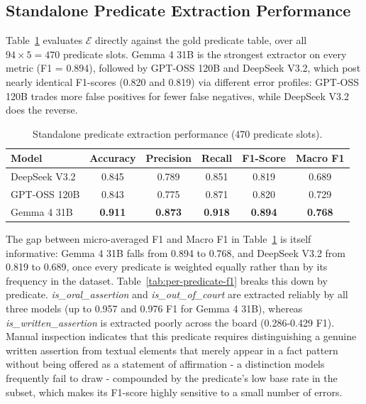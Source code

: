 \subsection{Standalone Predicate Extraction Performance}
\label{subsec:extraction}
Table~\ref{tab:predicate-extraction} evaluates $\mathcal{E}$ directly against the gold predicate table, over all $94 \times 5 = 470$ predicate slots. Gemma 4 31B is the strongest extractor on every metric (F1 = 0.894), followed by GPT-OSS 120B and DeepSeek V3.2, which post nearly identical F1-scores (0.820 and 0.819) via different error profiles: GPT-OSS 120B trades more false positives for fewer false negatives, while DeepSeek V3.2 does the reverse.

\begin{table}[htbp]
\centering
\caption{Standalone predicate extraction performance (470 predicate slots).}
\label{tab:predicate-extraction}
\begin{tabular}{lccccc}
\toprule
\textbf{Model} & \textbf{Accuracy} & \textbf{Precision} & \textbf{Recall} & \textbf{F1-Score} & \textbf{Macro F1} \\
\midrule
DeepSeek V3.2 & 0.845 & 0.789 & 0.851 & 0.819 & 0.689 \\
GPT-OSS 120B   & 0.843 & 0.775 & 0.871 & 0.820 & 0.729 \\
Gemma 4 31B   & \textbf{0.911} & \textbf{0.873} & \textbf{0.918} & \textbf{0.894} & \textbf{0.768} \\
\bottomrule
\end{tabular}
\end{table}

The gap between micro-averaged F1 and Macro F1 in Table~\ref{tab:predicate-extraction} is itself informative: Gemma 4 31B falls from 0.894 to 0.768, and DeepSeek V3.2 from 0.819 to 0.689, once every predicate is weighted equally rather than by its frequency in the dataset. Table~\ref{tab:per-predicate-f1} breaks this down by predicate. \textit{is\_oral\_assertion} and \textit{is\_out\_of\_court} are extracted reliably by all three models (up to 0.957 and 0.976 F1 for Gemma 4 31B), whereas \textit{is\_written\_assertion} is extracted poorly across the board (0.286-0.429 F1). Manual inspection indicates that this predicate requires distinguishing a genuine written assertion from textual elements that merely appear in a fact pattern without being offered as a statement of affirmation - a distinction models frequently fail to draw - compounded by the predicate's low base rate in the subset, which makes its F1-score highly sensitive to a small number of errors.

